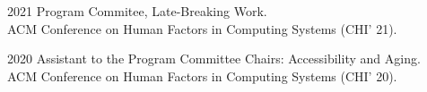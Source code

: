 
    \begin{cvreviews}
      \cvreview
        {2021}
        {Program Commitee, Late-Breaking Work. \\
        ACM Conference on Human Factors in Computing Systems (CHI' 21).}
    \end{cvreviews}

    \begin{cvreviews}
      \cvreview
        {2020}
        {Assistant to the Program Committee Chairs: Accessibility and Aging. \\
        ACM Conference on Human Factors in Computing Systems (CHI' 20).}
    \end{cvreviews}

